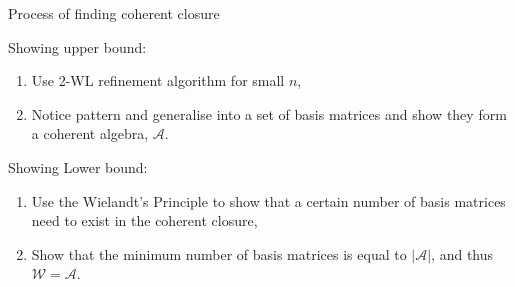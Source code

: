 \documentclass{beamer}
\begin{document}
\begin{frame}{Process of finding coherent closure}

Showing upper bound:
\begin{enumerate}
    \item Use 2-WL refinement algorithm for small $n$,
    \item Notice pattern and generalise into a set of basis matrices and show they form a coherent algebra, $\mathcal{A}$.
\end{enumerate}

\vspace{1em}
Showing Lower bound:
\begin{enumerate}
    \item Use the Wielandt's Principle to show that a certain number of basis matrices need to exist in the coherent closure,
    \item Show that the minimum number of basis matrices is equal to $|\mathcal{A}|$, and thus $\mathcal{W}=\mathcal{A}$.
\end{enumerate}
\end{frame}
\end{document}
